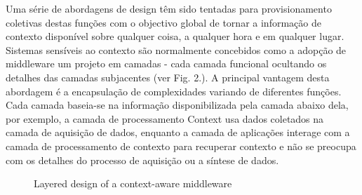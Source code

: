 \documentclass[12pt]{article} %
\begin{document}

Uma série de abordagens de design têm sido tentadas para provisionamento coletivas destas funções com o objectivo global de tornar a informação de contexto disponível sobre qualquer coisa, a qualquer hora e em qualquer lugar. Sistemas sensíveis ao contexto são normalmente concebidos como a adopção de middleware um projeto em camadas - cada camada funcional ocultando os detalhes das camadas subjacentes (ver Fig. 2.). A principal vantagem desta abordagem é a encapsulação de complexidades variando de diferentes funções. Cada camada baseia-se na informação disponibilizada pela camada abaixo dela, por exemplo, a camada de processamento Context usa dados coletados na camada de aquisição de dados, enquanto a camada de aplicações interage com a camada de processamento de contexto para recuperar contexto e não se preocupa com os detalhes do processo de aquisição ou a síntese de dados.

\begin{figure}[H]
\caption{Layered design of a context-aware middleware}
\label{fig:speciation}
\end{figure}
\end{document}

